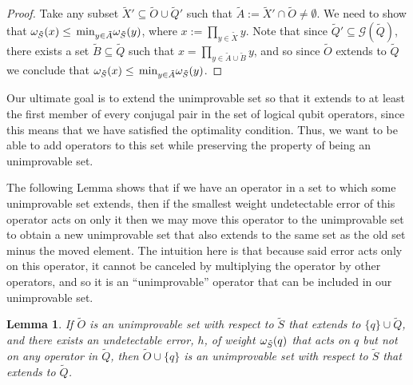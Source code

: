 \documentclass[twocolumn,showpacs,preprintnumbers,amsmath,amssymb,nofootinbib,pra,floatfix]{revtex4-1}
\newtheorem{lemma}{Lemma}
\newenvironment{remark}[1][Remark]{\begin{trivlist}
\item[\hskip \labelsep {\bfseries #1}]}{\end{trivlist}}
\newcommand{\set}{\tilde}
\newcommand{\genfun}{\mathcal{G}}
\begin{document}
\begin{proof}
Take any subset $\set X' \subseteq \set O\cup\set Q'$ such that $\set A := \set X'\cap \set O \ne \emptyset$.  We need to show that $\om_{\set S}(x)\le\min_{y\in\set A}\om_{\set S}(y)$, where $x := \prod_{y\in\set X} y$.  Note that since $\set Q'\subseteq\genfun(\set Q)$, there exists a set $\set B\subseteq \set Q$ such that $x = \prod_{y\in\set A\cup\set B} y$, and so since $\set O$ extends to $\set Q$ we conclude that $\om_{\set S}(x)\le\min_{y\in\set A}\om_{\set S}(y)$.
\end{proof}
\begin{remark}
Our ultimate goal is to extend the unimprovable set so that it extends to at least the first member of every conjugal pair in the set of logical qubit operators, since this means that we have satisfied the optimality condition.  Thus, we want to be able to add operators to this set while preserving the property of being an unimprovable set.

The following Lemma shows that if we have an operator in a set to which some unimprovable set extends, then if the smallest weight undetectable error of this operator acts on only it then we may move this operator to the unimprovable set to obtain a new unimprovable set that also extends to the same set as the old set minus the moved element.  The intuition here is that because said error acts only on this operator, it cannot be canceled by multiplying the operator by other operators, and so it is an ``unimprovable'' operator that can be included in our unimprovable set.
\end{remark}

\begin{lemma}
\label{move-it-over}
If $\set O$ is an unimprovable set with respect to $\set S$ that extends to $\{q\}\cup\set Q$, and there exists an undetectable error, $h$, of weight $\om_{\set S}(q)$ that acts on $q$ but not on any operator in $\set Q$, then $\set O\cup\{q\}$ is an unimprovable set with respect to $\set S$ that extends to $\set Q$.
\end{lemma}
\end{document}
